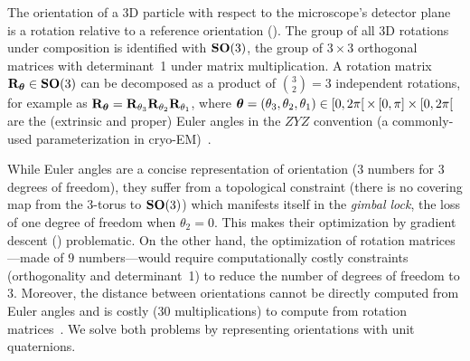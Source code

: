 The orientation of a 3D particle with respect to the microscope's detector plane is a rotation relative to a reference orientation ().
The group of all 3D rotations under composition is identified with $\mathrm{\mathbf{SO}}(3)$, the group of $3 \times 3$ orthogonal matrices with determinant~1 under matrix multiplication.
A rotation matrix $\mathbf{R}_{{\boldsymbol{\theta}}} \in \mathrm{\mathbf{SO}}(3)$ can be decomposed as a product of $\binom{3}{2}=3$ independent rotations, for example as $\mathbf{R}_{{\boldsymbol{\theta}}} = \mathbf{R}_{\theta_3} \mathbf{R}_{\theta_2} \mathbf{R}_{\theta_1}$, where ${\boldsymbol{\theta}} = (\theta_3,\theta_2,\theta_1) \in [0,2\pi[ \, \times \, [0,\pi] \times [0,2\pi[$ are the (extrinsic and proper) Euler angles in the $ZYZ$ convention (a commonly-used parameterization in cryo-EM)~\cite{sorzano2014interchanging}.

While Euler angles are a concise representation of orientation ($3$ numbers for $3$ degrees of freedom), they suffer from a topological constraint (there is no covering map from the $3$-torus to $\mathrm{\mathbf{SO}}(3)$) which manifests itself in the \textit{gimbal lock}, the loss of one degree of freedom when $\theta_2=0$. %
This makes their optimization by gradient descent () problematic.
On the other hand, the optimization of rotation matrices---made of $9$ numbers---would require computationally costly constraints (orthogonality and determinant~1) to reduce the number of degrees of freedom to $3$.
Moreover, the distance between orientations cannot be directly computed from Euler angles and is costly (30 multiplications) to compute from rotation matrices~\cite{huynh2009metrics}.
We solve both problems by representing orientations with unit quaternions.

